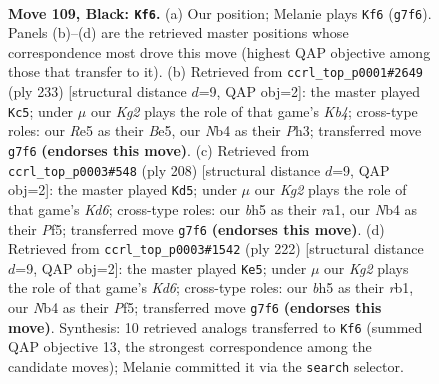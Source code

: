 \documentclass[11pt]{article}
\begin{document}
\clearpage

\begin{figure}[p]\centering
\begin{subfigure}{0.46\textwidth}\centering
\resizebox{\linewidth}{!}{%
\newchessgame
\chessboard[
  setfen={8/6k1/8/4r1pB/1n6/6K1/8/8 b - - 3 109},
  showmover=false,
  pgfstyle=straightmove, color=movearrow, markmove={g7-f6}
]}
\caption{}
\end{subfigure}\hfill
\begin{subfigure}{0.46\textwidth}\centering
\resizebox{\linewidth}{!}{%
\newchessgame
\chessboard[
  setfen={8/8/8/1k2b3/8/5Bpp/8/5K2 b - - 75 117},
  showmover=false,
  pgfstyle=straightmove, color=movearrow, markmove={b5-c5}
]}
\caption{}
\end{subfigure}
\\[4pt]
\begin{subfigure}{0.46\textwidth}\centering
\resizebox{\linewidth}{!}{%
\newchessgame
\chessboard[
  setfen={8/7k/3K3P/5P2/8/7R/8/r7 w - - 67 105},
  showmover=false,
  pgfstyle=straightmove, color=movearrow, markmove={d6-d5}
]}
\caption{}
\end{subfigure}\hfill
\begin{subfigure}{0.46\textwidth}\centering
\resizebox{\linewidth}{!}{%
\newchessgame
\chessboard[
  setfen={8/7k/3K3P/5P2/8/7R/8/1r6 w - - 75 112},
  showmover=false,
  pgfstyle=straightmove, color=movearrow, markmove={d6-e5}
]}
\caption{}
\end{subfigure}
\caption{\textbf{Move 109, Black: \texttt{Kf6}.} (a) Our position; Melanie plays \texttt{Kf6} (\texttt{g7f6}). Panels (b)--(d) are the retrieved master positions whose correspondence most drove this move (highest QAP objective among those that transfer to it). (b) Retrieved from \texttt{ccrl\_top\_p0001\#2649} (ply 233) [structural distance $d$=9, QAP obj=2]: the master played \texttt{Kc5}; under $\mu$ our \emph{Kg2} plays the role of that game's \emph{Kb4}; cross-type roles: our \emph{R}e5 as their \emph{B}e5, our \emph{N}b4 as their \emph{P}h3; transferred move \texttt{g7f6} \textbf{(endorses this move)}. (c) Retrieved from \texttt{ccrl\_top\_p0003\#548} (ply 208) [structural distance $d$=9, QAP obj=2]: the master played \texttt{Kd5}; under $\mu$ our \emph{Kg2} plays the role of that game's \emph{Kd6}; cross-type roles: our \emph{b}h5 as their \emph{r}a1, our \emph{N}b4 as their \emph{P}f5; transferred move \texttt{g7f6} \textbf{(endorses this move)}. (d) Retrieved from \texttt{ccrl\_top\_p0003\#1542} (ply 222) [structural distance $d$=9, QAP obj=2]: the master played \texttt{Ke5}; under $\mu$ our \emph{Kg2} plays the role of that game's \emph{Kd6}; cross-type roles: our \emph{b}h5 as their \emph{r}b1, our \emph{N}b4 as their \emph{P}f5; transferred move \texttt{g7f6} \textbf{(endorses this move)}. Synthesis: 10 retrieved analogs transferred to \texttt{Kf6} (summed QAP objective 13, the strongest correspondence among the candidate moves); Melanie committed it via the \texttt{search} selector.}
\label{fig:thought-m217}
\end{figure}
\end{document}
